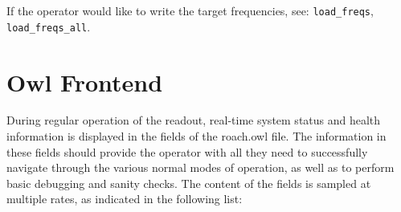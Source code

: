 \begin{itemize}[leftmargin=*,label={}]
If the operator would like to write the target frequencies, see: \texttt{load\_freqs}, \texttt{load\_freqs\_all}.
\end{itemize}

\section{Owl Frontend}\label{owl}
During regular operation of the readout, real-time system status and health information is displayed in the fields of the roach.owl file. The information in these fields should provide the operator with all they need to successfully navigate through the various normal modes of operation, as well as to perform basic debugging and sanity checks. The content of the fields is sampled at multiple rates, as indicated in the following list:

